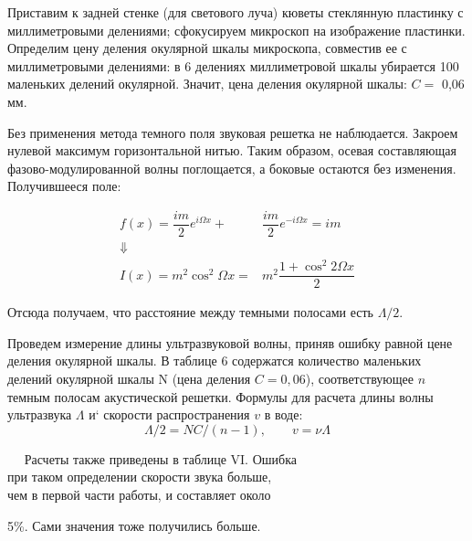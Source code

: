 \documentclass[journal, a4paper]{IEEEtran}
\begin{document}
Приставим к задней стенке (для светового луча) кюветы стеклянную пластинку с миллиметровыми делениями; сфокусируем микроскоп на изображение пластинки. Определим цену деления окулярной шкалы микроскопа, совместив ее с миллиметровыми делениями: в 6 делениях миллиметровой шкалы убирается 100 маленьких делений окулярной. Значит, цена деления окулярной шкалы: $ C = $ 0,06 мм.

Без применения метода темного поля звуковая решетка не наблюдается. Закроем нулевой максимум горизонтальной нитью. Таким образом, осевая составляющая фазово-модулированной волны поглощается, а боковые остаются без изменения. Получившееся поле: 

\begin{equation}\label{}
\begin{aligned}
f(x) = \dfrac{im}{2} e^{i\Omega x} +  &\dfrac{im}{2} e^{-i\Omega x} = im\\ \Downarrow&\\
I(x) = m^2 \cos ^2 \Omega x = &m^2 \dfrac{1 + \cos ^2 2 \Omega x}{2}
\end{aligned}
\end{equation}

Отсюда получаем, что расстояние между темными полосами есть $ \Lambda/2 $.

Проведем измерение длины ультразвуковой волны, приняв ошибку равной цене деления окулярной шкалы. В таблице 6 содержатся количество маленьких делений окулярной шкалы N (цена деления $ C = 0,06 $), соответствующее $ n $ темным полосам акустической решетки.
Формулы для расчета длины волны ультразвука $ \Lambda $ и` скорости распространения $ v $ в воде:
\begin{equation}\label{}
\Lambda/2  = NC/(n - 1),  \qquad v = \nu\Lambda
\end{equation}

\,\,\,\,\,\,\,\,Расчеты также приведены в таблице VI. Ошибка\\ \hspace*{17pt} при таком определении скорости звука больше, \\ \hspace*{21pt}чем в первой части работы, и
составляет около 

\hspace*{12pt}5\%. Сами значения тоже получились больше.\\[0.3cm]
\end{document}
